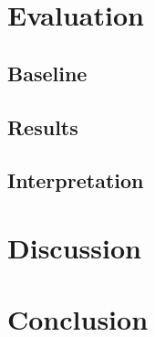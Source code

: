 \documentclass[acmsmall]{acmart}
\begin{document}
\section{Evaluation}

\subsection{Baseline}

\subsection{Results}

\subsection{Interpretation}


\section{Discussion}

\section{Conclusion}




\end{document}
